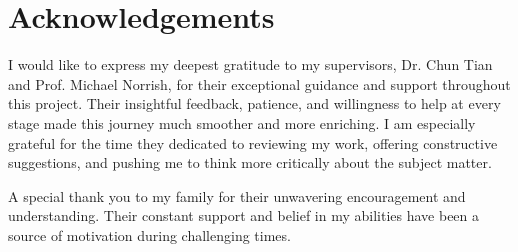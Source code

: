 \chapter*{Acknowledgements}

I would like to express my deepest gratitude to my supervisors, Dr. Chun Tian and Prof. Michael Norrish, for their exceptional guidance and support throughout this project. Their insightful feedback, patience, and willingness to help at every stage made this journey much smoother and more enriching. I am especially grateful for the time they dedicated to reviewing my work, offering constructive suggestions, and pushing me to think more critically about the subject matter.

A special thank you to my family for their unwavering encouragement and understanding. Their constant support and belief in my abilities have been a source of motivation during challenging times.

\newpage
